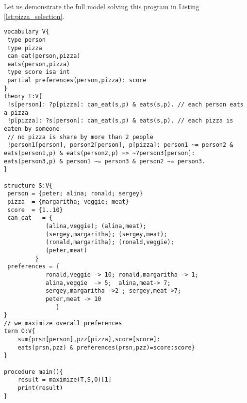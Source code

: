 Let us demonstrate the full model solving this program in Listing \ref{lst:pizza_selection}.
\begin{minipage}{\linewidth}
\begin{lstlisting}[caption=Encoding pizza selection problem, label=lst:pizza_selection,basicstyle=\ttfamily, basicstyle=\small]
vocabulary V{
 type person
 type pizza
 can_eat(person,pizza)
 eats(person,pizza)
 type score isa int
 partial preferences(person,pizza): score
}
theory T:V{
 !s[person]: ?p[pizza]: can_eat(s,p) & eats(s,p). // each person eats a pizza 
 !p[pizza]: ?s[person]: can_eat(s,p) & eats(s,p). // each pizza is eaten by someone
 // no pizza is share by more than 2 people
 !person1[person], person2[person], p[pizza]: person1 ~= person2 & eats(person1,p) & eats(person2,p) => ~?person3[person]: eats(person3,p) & person1 ~= person3 & person2 ~= person3.
}

structure S:V{
 person = {peter; alina; ronald; sergey}
 pizza  = {margaritha; veggie; meat}
 score  = {1..10}
 can_eat   = {
        	(alina,veggie); (alina,meat); 
         	(sergey,margaritha); (sergey,meat);
         	(ronald,margaritha); (ronald,veggie);
         	(peter,meat)
     	 }
 preferences = {	
            ronald,veggie -> 10; ronald,margaritha -> 1; 
            alina,veggie  -> 5;  alina,meat-> 7;
            sergey,margaritha ->2 ; sergey,meat->7;
            peter,meat -> 10
        	   }	
}
// we maximize overall preferences
term O:V{
    sum{prsn[person],pzz[pizza],score[score]: 
    eats(prsn,pzz) & preferences(prsn,pzz)=score:score}
}

procedure main(){
    result = maximize(T,S,O)[1]
    print(result)
}

\end{lstlisting}
\end{minipage}
\pubrevend


\pubrev


